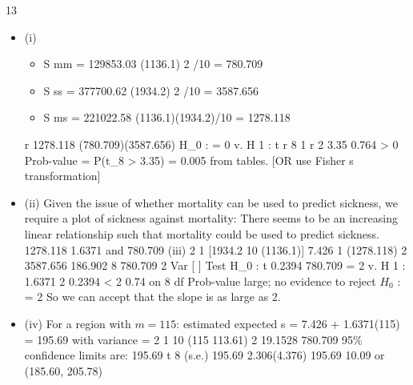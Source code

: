 \documentclass[a4paper,12pt]{article}
\begin{document}
13
\begin{itemize}
\item (i)
\begin{itemize}
\item S mm = 129853.03 (1136.1) 2 /10 = 780.709
\item S ss = 377700.62 (1934.2) 2 /10 = 3587.656
\item S ms = 221022.58 (1136.1)(1934.2)/10 = 1278.118
\end{itemize} 
r 1278.118
(780.709)(3587.656)
H_0 : = 0 v. H 1 :
t
r 8
1 r 2
3.35
0.764
> 0
Prob-value = P(t_8 > 3.35) = 0.005 from tables.
[OR use Fisher s transformation]
\item (ii)
Given the issue of whether mortality can be used to predict sickness, we require a plot of sickness against mortality:
There seems to be an increasing linear relationship such that mortality could be used to predict sickness.
1278.118
1.6371 and
780.709
(iii)
2
1
[1934.2
10
(1136.1)] 7.426
1
(1278.118) 2
{3587.656
} 186.902
8
780.709
2
Var [ ]
Test H_0 :
t
0.2394
780.709
= 2 v. H 1 :
1.6371 2
0.2394
< 2
0.74 on 8 df
Prob-value large; no evidence to reject $H_0$ : = 2
So we can accept that the slope is as large as 2.
\item (iv)
For a region with $m = 115$:
estimated expected s = 7.426 + 1.6371(115) = 195.69
with variance =
2
1
{
10
(115 113.61) 2
} 19.1528
780.709
95\%  confidence limits are:
195.69
t 8 (s.e.)
195.69
2.306(4.376)
195.69
10.09 or (185.60, 205.78)
\end{itemize}
\end{document}
